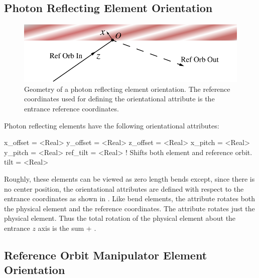 \subsection{Photon Reflecting Element Orientation}
\label{ss:photon.orient}

\begin{figure}[ht]
  \centering
  \includegraphics{reflect-orient.pdf}
  \caption[Geometry of a photon reflecting element orientation]{
Geometry of a photon reflecting element orientation.
The reference coordinates used for defining the orientational attribute
is the entrance reference coordinates. 
}
  \label{f:reflect.orient}
\end{figure}

Photon reflecting elements have the following orientational attributes:
\begin{example}
  x_offset = <Real>
  y_offset = <Real>
  z_offset = <Real>
  x_pitch  = <Real>
  y_pitch  = <Real>
  ref_tilt = <Real>    ! Shifts both element and reference orbit.
  tilt     = <Real>    
\end{example}
Roughly, these elements can be viewed as zero length bends except,
since there is no center position, the orientational attributes are
defined with respect to the entrance coordinates as shown in
. Like bend elements, the  attribute
rotates both the physical element and the reference coordinates.
The  attribute rotates just the physical element. Thus
the total rotation of the physical element about the entrance $z$
axis is the sum  + .

\subsection{Reference Orbit Manipulator Element Orientation}
\label{ss:manip.orient}

